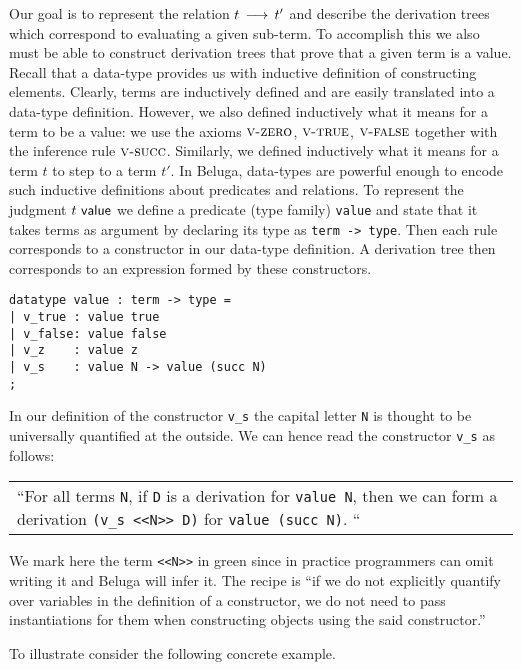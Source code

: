 Our goal is to represent the relation $t \mathrel{\,\longrightarrow\,} t'$ and describe the derivation
trees which correspond to evaluating a given sub-term. To accomplish this we
also must be able to construct derivation trees that prove that a given term is
a value. Recall that a data-type provides us with inductive definition of
constructing elements. Clearly, terms are inductively defined and are easily
translated into a data-type definition. However, we also defined inductively
what it means for a term to be a value: we use the axioms $\textsc{v-zero}$, $\textsc{v-true}$,
$\textsc{v-false}$ together with the inference rule $\textsc{v-succ}$. Similarly, we defined
inductively what it means for a term $t$ to step to a term $t'$. In Beluga,
data-types are powerful enough to encode such inductive definitions about
predicates and relations. To represent the judgment $t ~\textsf{value}$ we define a
predicate (type family) \lstinline!value! and state that it takes terms as
argument by declaring its type as \lstinline!term -> type!. Then each rule
corresponds to a constructor in our data-type definition. A derivation tree then
corresponds to an expression formed by these constructors.

\begin{lstlisting}
datatype value : term -> type =
| v_true : value true
| v_false: value false
| v_z    : value z
| v_s    : value N -> value (succ N)
;
\end{lstlisting}

In our definition of the constructor \lstinline!v_s! the capital letter
\lstinline!N! is thought to be universally quantified at the outside. We can
hence read the constructor \lstinline!v_s! as follows:

\begin{center}
\begin{tabular}{p{12cm}}
``For all terms
\lstinline$N$, if \lstinline!D! is a derivation for \lstinline!value N!, then we can form a derivation
\lstinline!(v_s <<N>> D)! for \lstinline!value (succ N)!. ``
\end{tabular}
\end{center}


We mark here the term \lstinline!<<N>>! in green since in practice programmers
can omit writing it and Beluga will infer it. The recipe is ``if we do not
explicitly quantify over variables in the definition of a constructor, we do not
need to pass instantiations for them when constructing objects using the said constructor.''

To illustrate consider the following concrete example.\\[1em]

